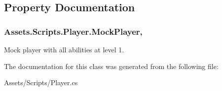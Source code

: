 \subsection{Property Documentation}
\subsubsection[{\texorpdfstring{Mock\+Player}{MockPlayer}}]{ Assets.\+Scripts.\+Player.\+Mock\+Player\hspace{0.3cm}{\ttfamily [static]}, {\ttfamily [get]}}\hypertarget{class_assets_1_1_scripts_1_1_player_ac7e9d32a9524d55fb9f975208a7d89a2}{}\label{class_assets_1_1_scripts_1_1_player_ac7e9d32a9524d55fb9f975208a7d89a2}


Mock player with all abilities at level 1. 



The documentation for this class was generated from the following file\+:\begin{DoxyCompactItemize}
\item 
Assets/\+Scripts/Player.\+cs\end{DoxyCompactItemize}
